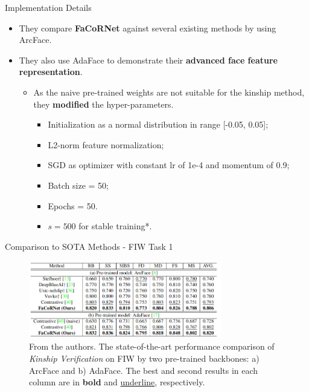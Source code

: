 \documentclass[aspectratio=169,xcolor=dvipsnames]{beamer}
\begin{document}
\begin{frame}{Implementation Details}
    \begin{itemize}
        \item They compare \textbf{FaCoRNet} against several existing methods by using ArcFace.
        \item They also use AdaFace to demonstrate their \textbf{advanced face feature representation}.
            \begin{itemize}
                \item As the naive pre-trained weights are not suitable for the kinship method, they \textbf{modified} the hyper-parameters.
                    \begin{itemize}
                        \item Initialization as a normal distribution in range [-0.05, 0.05];
                        \item L2-norm feature normalization;
                        \item SGD as optimizer with constant lr of 1e-4 and momentum of 0.9;
                        \item Batch size = 50;
                        \item Epochs = 50.
                        \item $s = 500$ for stable training*.
                    \end{itemize}
            \end{itemize}
    \end{itemize}
\end{frame}


\begin{frame}{Comparison to SOTA Methods - FIW Task 1}
    \begin{figure}
        \centering
        \includegraphics[width=0.75\textwidth]{imgs/T1.png}
        \caption{From the authors. The state-of-the-art performance comparison of \textit{Kinship Verification} on FIW by two pre-trained backbones: a) ArcFace and b) AdaFace. The best and second results in each column are in \textbf{bold} and \underline{underline}, respectively.}
        \label{fig:results-t1}
    \end{figure}
\end{frame}
\end{document}
